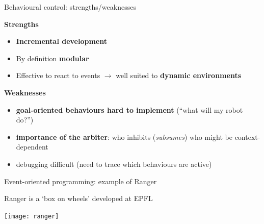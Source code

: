 \documentclass[compress]{beamer}
\begin{document}


\begin{frame}{Behavioural control: strengths/weaknesses}

    {\bf Strengths}

    \begin{itemize}
        \item {\bf Incremental development}
        \item By definition {\bf modular}
        \item Effective to react to events $\rightarrow$ well suited to {\bf
            dynamic environments}
    \end{itemize}

    \pause
    {\bf Weaknesses}

    \begin{itemize}
        \item {\bf goal-oriented behaviours hard to implement} (``what will my robot do?'')
        \item {\bf importance of the arbiter}: who inhibits (\ie \emph{subsumes}) who might be context-dependent
        \item debugging difficult (need to trace which behaviours are active)
    \end{itemize}


\end{frame}

\begin{frame}{Event-oriented programming: example of Ranger}

    Ranger is a `box on wheels' developed at EPFL

    \begin{center}
        \texttt{[image: ranger]}
    \end{center}
\end{frame}

\end{document}
